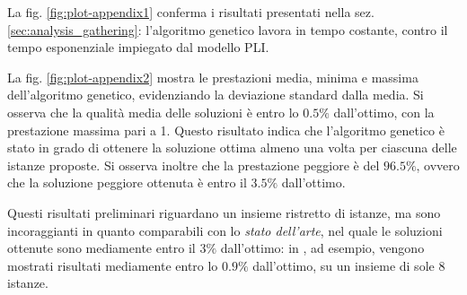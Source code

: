 \documentclass[a4paper, 10pt]{report}
\begin{document}
La fig. \ref{fig:plot-appendix1} conferma i risultati presentati nella sez.
\ref{sec:analysis_gathering}: l'algoritmo genetico lavora in tempo
costante, contro il tempo esponenziale impiegato dal modello PLI.

La fig. \ref{fig:plot-appendix2} mostra le prestazioni media, minima e
massima dell'algoritmo genetico, evidenziando la deviazione standard
dalla media. Si osserva che la qualità media delle soluzioni è entro lo
$0.5\%$ dall'ottimo, con la prestazione massima pari a 1. Questo risultato
indica che l'algoritmo genetico è stato in grado di ottenere la soluzione
ottima almeno una volta per ciascuna delle istanze proposte. Si osserva
inoltre che la prestazione peggiore è del $96.5\%$, ovvero che la soluzione
peggiore ottenuta è entro il $3.5\%$ dall'ottimo.

Questi risultati preliminari riguardano un insieme ristretto di istanze,
ma sono incoraggianti in quanto comparabili con lo \emph{stato dell'arte},
nel quale le soluzioni ottenute sono mediamente entro il $3\%$ dall'ottimo:
in \cite[Noraini et al.]{noraini2011}, ad esempio, vengono mostrati
risultati mediamente entro lo $0.9\%$ dall'ottimo, su un insieme di sole
8 istanze.



\nocite{nicolas2014}


\end{document}
